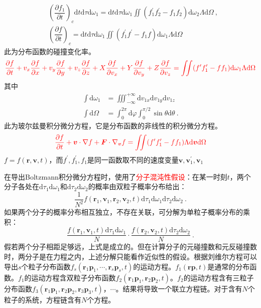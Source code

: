 \documentclass[12pt,a4paper]{article}
\renewcommand{\vec}[1]{\boldsymbol{#1}}
\newcommand{\dif}{\mathrm{d}}
\begin{document}
\begin{align}
\nonumber & \left(\dfrac{\partial f_1}{\partial t} \right)_c \dif t \dif \tau \dif \omega_1 = \dif t \dif \tau \dif \omega_1 \iint (f^\prime_1 f^\prime_2 - f_1 f_2) \dif \omega_2 \Lambda \dif \Omega ~,  \\
& \left(\dfrac{\partial f}{\partial t} \right)_c = \dif t \dif \tau \dif \omega_1 \iint (f^\prime_1 f^\prime - f_1 f) \dif \omega_1 \Lambda \dif \Omega
\end{align}
此为分布函数的碰撞变化率。
\begin{equation}
\color{red} \frac{\partial f}{\partial t} +v_x \dfrac{\partial f}{\partial x} +v_y \dfrac{\partial f}{\partial y}  + v_z \dfrac{\partial f}{\partial z}  +X \dfrac{\partial f}{\partial v_x} +Y \dfrac{\partial f}{\partial v_y} +Z \dfrac{\partial f}{\partial v_z} =\iint (f^\prime f_1^\prime -f f_1) \dif \omega_1 \Lambda \dif \Omega
\end{equation}
其中
\begin{align*}
\int \dif \omega_1 &= \iiint_{-\infty}^{+\infty} \dif v_{1x} \dif v_{1y} \dif v_{1z} \\
\int \dif \Omega &= \int_0^{2\pi} \dif \varphi \int_0^{\pi/2} \sin \theta \dif \theta ~.
\end{align*}
此为玻尔兹曼积分微分方程，它是分布函数的非线性的积分微分方程。
\begin{equation}
\color{red} \frac{\partial f}{\partial t} +\vec{v} \cdot\nabla f +\vec{F} \cdot \nabla_{\vec{v}} f =\iint (f^\prime f_1^\prime -f f_1) \Lambda \dif \vec{v} \dif \Omega
\end{equation}
$f=f(\vec{r}, \vec{v}, t)$，而$f^\prime, f_1^\prime, f_1$是同一函数取不同的速度变量$\vec{v}, \vec{v}_1^\prime, \vec{v}_1$


在导出Boltzmann积分微分方程时，使用了\textcolor{red}{分子混沌性假设}：在某一时刻$t$，两个分子各处在$\dif \tau_1 \dif \omega_1$和$\dif \tau_2 \dif \omega_2$的概率由双粒子概率分布给出：
\begin{equation}
\dfrac{1}{N^2} f(\vec{r}_1, \vec{v}_1, \vec{r}_2, \vec{v}_2, t) \dif \tau_1 \dif \omega_1 \dif \tau_2 \dif \omega_2 ~.
\end{equation}
如果两个分子的概率分布相互独立，不存在关联，可分解为单粒子概率分布的乘积：
\begin{equation}
\dfrac{f(\vec{r}_1, \vec{v}_1, t) \dif \tau_1 \dif \omega_1}{N} \cdot \dfrac{f(\vec{r}_2, \vec{v}_2, t) \dif \tau_2 \dif \omega_2}{N} ~.
\end{equation}
假若两个分子相距足够远，上式是成立的。但在计算分子的元碰撞数和元反碰撞数时，两分子是在力程之内，上述分解只能看作近似性的假设。根据刘维尔方程可以导出$s$个粒子分布函数$f_s(\vec{r}_1 \vec{p}_1, \cdots, \vec{r}_s \vec{p}_s, t)$的运动方程。$f_1(\vec{r} \vec{p}, t)$是通常的分布函数。$f_1$的运动方程含双粒子分布函数$f_2(\vec{r}_1 \vec{p}_1, \vec{r}_2 \vec{p}_2, t)$。$f_2$的运动方程含有三粒子分布函数$f_3(\vec{r}_1 \vec{p}_1, \vec{r}_2 \vec{p}_2, \vec{r}_3 \vec{p}_3, t)$，$\cdots$。结果将导致一个联立方程链。对于含有$N$个粒子的系统，方程链含有$N$个方程。
\end{document}

